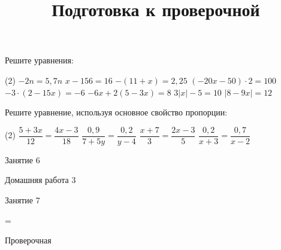\begin{homework}[number=1]
	\begin{listofex}
		\item Решите уравнения: %
		\begin{tasks}(2)
			\task \( -2n=5,7n \)
			\task \( x-156=16 \)
			\task \( -(11+x)=2,25 \)
			\task \( (-20x-50)\cdot 2 = 100 \)
			\task \( -3 \cdot (2-15x) = -6 \)
			\task \( -6x+2(5-3x)=8 \)
			\task \( 3|x|-5=10 \)
			\task \( |8-9x|=12 \)
		\end{tasks}
		\item Решите уравнение, используя основное свойство пропорции:
		\begin{tasks}(2)
			\task \( \dfrac{5+3x}{12} = \dfrac{4x-3}{18} \)
			\task \( \dfrac{0,9}{7+5y} = \dfrac{0,2}{y-4} \)
			\task \( \dfrac{x+7}{3} = \dfrac{2x-3}{5} \)
			\task \( \dfrac{0,2}{x+3} = \dfrac{0,7}{x-2} \)
		\end{tasks}
		
	\end{listofex}
\end{homework}

\begin{class}[number=6]
	\begin{listofex}
		\item Занятие 6
	\end{listofex}
\end{class}

\begin{homework}[number=3]
	\begin{listofex}
		\item Домашняя работа 3
	\end{listofex}
\end{homework}

\begin{class}[number=7]
	\title{Подготовка к проверочной}
	\begin{listofex}
		\item Занятие 7
	\end{listofex}
\end{class}

=%
\begin{exam}
	\begin{listofex}
		\item Проверочная
	\end{listofex}
\end{exam}

